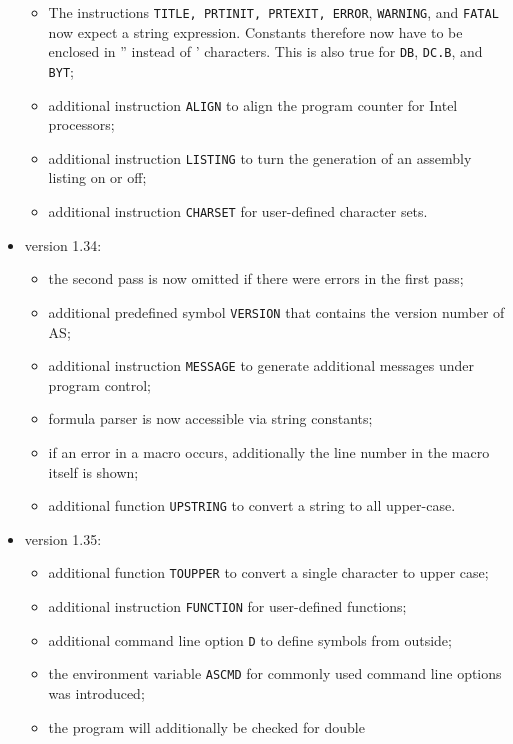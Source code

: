 \documentclass[12pt,twoside]{report}
\newcommand{\tty}[1]{{\tt #1}}
\newcommand{\asname}{{AS}}
\begin{document}
\begin{itemize}
{\begin{itemize}
      \item{The instructions \tty{TITLE, PRTINIT, PRTEXIT, ERROR},
            \tty{WARNING}, and \tty{FATAL} now expect a string expression.
            Constants therefore now have to be enclosed in
            '' instead of ' characters.  This is also true
            for \tty{DB}, \tty{DC.B}, and \tty{BYT};}
      \item{additional instruction \tty{ALIGN} to align the program
            counter for Intel processors;}
      \item{additional instruction \tty{LISTING} to turn the generation
            of an assembly listing on or off;}
      \item{additional instruction \tty{CHARSET} for user-defined
            character sets.}
      \end{itemize}}
\item{version 1.34:
      \begin{itemize}
      \item{the second pass is now omitted if there were errors
            in the first pass;}
      \item{additional predefined symbol \tty{VERSION} that contains
            the version number of \asname{};}
      \item{additional instruction \tty{MESSAGE} to generate additional
            messages under program control;}
      \item{formula parser is now accessible via string constants;}
      \item{if an error in a macro occurs, additionally the line
            number in the macro itself is shown;}
      \item{additional function \tty{UPSTRING} to convert a string to
            all upper-case.}
      \end{itemize}}
\item{version 1.35:
      \begin{itemize}
      \item{additional function \tty{TOUPPER} to convert a single
            character to upper case;}
      \item{additional instruction \tty{FUNCTION} for user-defined
            functions;}
      \item{additional command line option \tty{D} to define symbols
            from outside;}
      \item{the environment variable \tty{ASCMD} for commonly used
            command line options was introduced;}
      \item{the program will additionally be checked for double
}
\end{itemize}}
\end{itemize}
\end{document}
